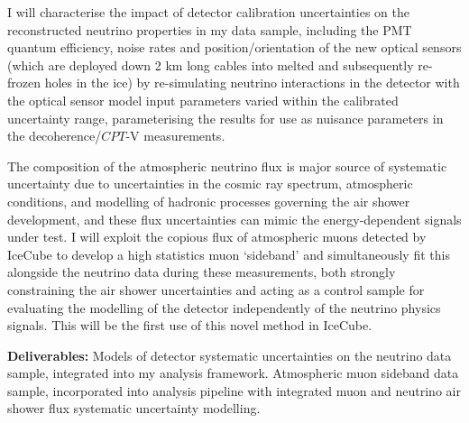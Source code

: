 \documentclass[a4paper,11pt]{article}
\begin{document}
I will characterise the impact of detector calibration uncertainties on the reconstructed neutrino properties in my data sample, including the PMT quantum efficiency, noise rates and position/orientation of the new optical sensors (which are deployed down 2 km long cables into melted and subsequently re-frozen holes in the ice) by re-simulating neutrino interactions in the detector with the optical sensor model input parameters varied within the calibrated uncertainty range, parameterising the results for use as nuisance parameters in the decoherence/$CPT$-V measurements.

The composition of the atmospheric neutrino flux is major source of systematic uncertainty due to uncertainties in the cosmic ray spectrum, atmospheric conditions, and modelling of hadronic processes governing the air shower development, and these flux uncertainties can mimic the energy-dependent signals under test. I will exploit the copious flux of atmospheric muons detected by IceCube to develop a high statistics muon `sideband' and simultaneously fit this alongside the neutrino data during these measurements, both strongly constraining the air shower uncertainties and acting as a control sample for evaluating the modelling of the detector independently of the neutrino physics signals. This will be the first use of this novel method in IceCube. 


\textbf{Deliverables:} Models of detector systematic uncertainties on the neutrino data sample, integrated into my analysis framework. Atmospheric muon sideband data sample, incorporated into analysis pipeline with integrated muon and neutrino air shower flux systematic uncertainty modelling.  \\



\end{document}
